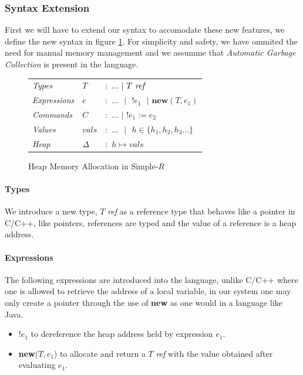 \documentclass[a4paper,12pt]{report}
\begin{document}
\subsubsection{Syntax Extension}
First we will have to extend our syntax to accomodate these new features, we define 
the new syntax in figure \ref{fig:ptr_syntax}. For simplicity and safety, 
we have ommited the need for manual memory management and we 
assumme that \textit{Automatic Garbage Collection} \cite{GC} is present in 
the language. 

\begin{figure}[H]
  \begin{center}
    \begin{tabular} {l l l}
      \textit{Types} & $T$ & $:$ $...\text{ }|\text{ }T\text{ \textit{ref }}$ \\
      \textit{Expressions} & $e$ & $:$ $...\text{ }|\text{ }!e_1\text{ }|\textbf{ new}(T, e_1)$\\
      \textit{Commands} & $C$ & $:$ $...$ $|$ $!e_1 := e_2$ \\
      \textit{Values} & $vals$& $:$ $...\text{ }|\text{ }h \in \{h_1,h_2, h_3...\} $ \\
      \textit{Heap} & $\Delta$& $:$ $h \mapsto vals$\\
    \end{tabular}
  \end{center}
  \caption{Heap Memory Allocation in Simple-$R$}
  \label{fig:ptr_syntax}
\end{figure}

\paragraph{Types}
We introduce a new type, $T$ \textit{ref} as a reference type that behaves like 
a pointer in C/C++, like pointers, references are typed and the value of a reference 
is a heap address. 

\paragraph{Expressions}
The following expressions are introduced into the language, unlike C/C++ 
where one is allowed to retrieve the address of a local variable, in our 
system one may only create a pointer through the use of \textbf{new} as 
one would in a language like Java.
\begin{itemize}
  \item $!e_1$ to dereference the heap address held by expression $e_1$.
  \item \textbf{new}($T, e_1$) to allocate and return a $T$ \textit{ref} with the 
  value obtained after evaluating $e_1$.
\end{itemize}
\end{document}
